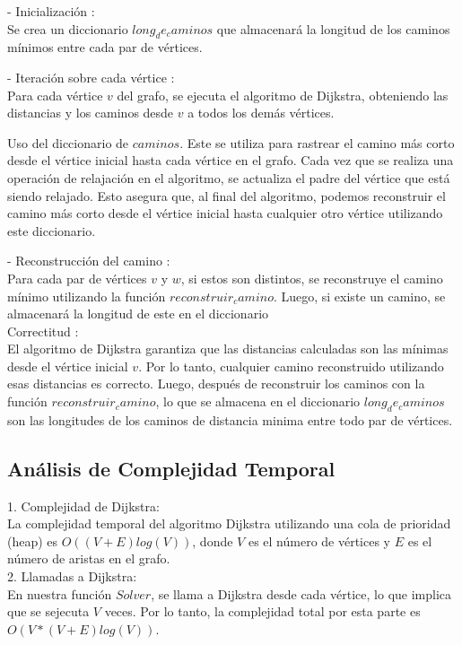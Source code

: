 \documentclass[
10pt, %
a4paper, %
oneside, %
headinclude,footinclude, %
BCOR5mm, %
]{scrartcl}
\begin{document}
- Inicialización :\\
Se crea un diccionario ${long_de_caminos}$ que almacenará la longitud de los caminos mínimos entre cada par de 
vértices.


- Iteración sobre cada vértice :\\ 
Para cada vértice $v$ del grafo, se ejecuta el algoritmo de Dijkstra, obteniendo las distancias y los caminos desde $v$
a todos los demás vértices.

Uso del diccionario de $caminos$. Este se utiliza para rastrear el camino más corto desde el vértice inicial hasta cada 
vértice en el grafo. Cada vez que se realiza una operación de relajación en el algoritmo, se actualiza el padre del vértice 
que está siendo relajado. Esto asegura que, al final del algoritmo, podemos reconstruir el camino más corto desde el vértice inicial
hasta cualquier otro vértice utilizando este diccionario.


- Reconstrucción del camino : \\
Para cada par de vértices $v$ y $w$, si estos son distintos, se reconstruye el camino mínimo utilizando la función $reconstruir_camino$. Luego, 
si existe un camino, se almacenará la longitud de este en el diccionario\\


Correctitud : \\
El algoritmo de Dijkstra garantiza que las distancias calculadas son las mínimas desde el vértice inicial $v$. Por lo tanto, 
cualquier camino reconstruido utilizando esas distancias es correcto. Luego, después de reconstruir los caminos con la función $reconstruir_camino$, 
lo que se almacena en el diccionario $long_de_caminos$ son las longitudes de los caminos de distancia minima entre todo par de 
vértices.


\subsection{Análisis de Complejidad Temporal}

1. Complejidad de Dijkstra:\\

La complejidad temporal del algoritmo Dijkstra utilizando una cola de prioridad (heap) es $O((V+E)log(V))$, donde $V$ es el número de vértices y $E$ es el número de 
aristas en el grafo.\\

2. Llamadas a Dijkstra:\\

En nuestra función $Solver$, se llama a Dijkstra desde cada vértice, lo que implica que se sejecuta $V$ veces. 
Por lo tanto, la complejidad total por esta parte es $O(V*(V+E)log(V))$. \\
\end{document}
